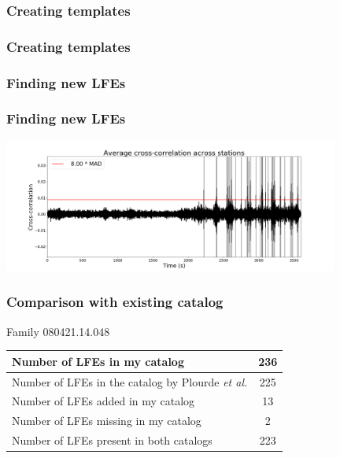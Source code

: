 \documentclass{beamer}
\begin{document}
	\begin{frame}
		\frametitle{Creating templates}
	\end{frame}

	\begin{frame}
		\frametitle{Creating templates}
	\end{frame}

	\begin{frame}
		\frametitle{Finding new LFEs}
	\end{frame}

	\begin{frame}
		\frametitle{Finding new LFEs}
		\begin{center}
			\includegraphics[width=11cm, trim={0cm 0cm 0cm 0cm}, clip]{other/20080421_130000.png}
		\end{center}
	\end{frame}

	\begin{frame}
		\frametitle{Comparison with existing catalog}
		\begin{center}
		Family 080421.14.048

		\vspace{2em}

		\begin{tabular}{| l | c |}
			\hline
			Number of LFEs in my catalog & 236 \\
			\hline
			Number of LFEs in the catalog by Plourde \textit{et al.} & 225 \\
			\hline
			Number of LFEs added in my catalog & 13 \\
			\hline
			Number of LFEs missing in my catalog & 2 \\
			\hline
			Number of LFEs present in both catalogs & 223 \\
			\hline
		\end{tabular}
		\end{center}
	\end{frame}
\end{document}

